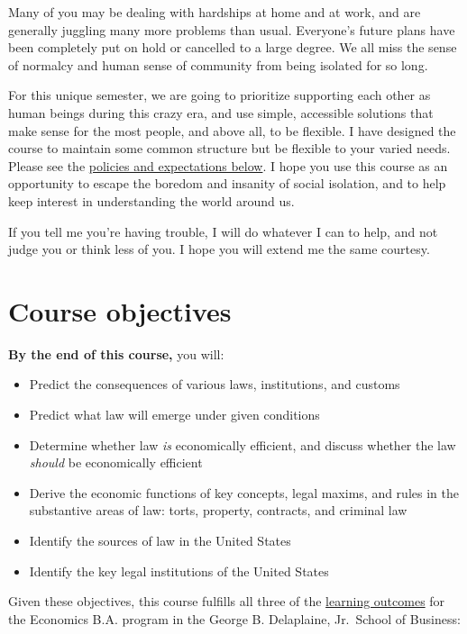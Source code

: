 \documentclass{article}
\providecommand{\tightlist}{%
  \setlength{\itemsep}{0pt}\setlength{\parskip}{0pt}}
\begin{document}
Many of you may be dealing with hardships at home and at work, and are
generally juggling many more problems than usual. Everyone's future
plans have been completely put on hold or cancelled to a large degree.
We all miss the sense of normalcy and human sense of community from
being isolated for so long.

For this unique semester, we are going to prioritize supporting each
other as human beings during this crazy era, and use simple, accessible
solutions that make sense for the most people, and above all, to be
flexible. I have designed the course to maintain some common structure
but be flexible to your varied needs. Please see the
\protect\hyperlink{policies-and-expectations}{policies and expectations
below}. I hope you use this course as an opportunity to escape the
boredom and insanity of social isolation, and to help keep interest in
understanding the world around us.

If you tell me you're having trouble, I will do whatever I can to help,
and not judge you or think less of you. I hope you will extend me the
same courtesy.

\hypertarget{course-objectives}{%
\section*{Course objectives}\label{course-objectives}}

\textbf{By the end of this course,} you will:

\begin{itemize}
\tightlist
\item
  Predict the consequences of various laws, institutions, and customs
\item
  Predict what law will emerge under given conditions
\item
  Determine whether law \emph{is} economically efficient, and discuss
  whether the law \emph{should} be economically efficient
\item
  Derive the economic functions of key concepts, legal maxims, and rules
  in the substantive areas of law: torts, property, contracts, and
  criminal law
\item
  Identify the sources of law in the United States
\item
  Identify the key legal institutions of the United States
\end{itemize}

Given these objectives, this course fulfills all three of the
\href{https://www.hood.edu/academics/departments/george-b-delaplaine-jr-school-business/student-learning-outcomes}{learning
outcomes} for the Economics B.A. program in the George B. Delaplaine,
Jr.~School of Business:
\end{document}

